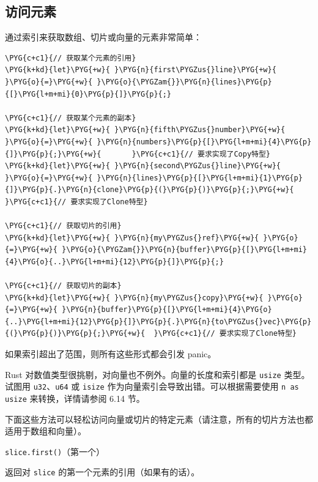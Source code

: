 \subsection{访问元素}

通过索引来获取数组、切片或向量的元素非常简单：

\begin{Verbatim}[commandchars=\\\{\},breaklines=true,breakanywhere=true,fontsize=\codefont,xleftmargin=17bp]
\PYG{c+c1}{// 获取某个元素的引用}
\PYG{k+kd}{let}\PYG{+w}{ }\PYG{n}{first\PYGZus{}line}\PYG{+w}{ }\PYG{o}{=}\PYG{+w}{ }\PYG{o}{\PYGZam{}}\PYG{n}{lines}\PYG{p}{[}\PYG{l+m+mi}{0}\PYG{p}{]}\PYG{p}{;}

\PYG{c+c1}{// 获取某个元素的副本}
\PYG{k+kd}{let}\PYG{+w}{ }\PYG{n}{fifth\PYGZus{}number}\PYG{+w}{ }\PYG{o}{=}\PYG{+w}{ }\PYG{n}{numbers}\PYG{p}{[}\PYG{l+m+mi}{4}\PYG{p}{]}\PYG{p}{;}\PYG{+w}{       }\PYG{c+c1}{// 要求实现了Copy特型}
\PYG{k+kd}{let}\PYG{+w}{ }\PYG{n}{second\PYGZus{}line}\PYG{+w}{ }\PYG{o}{=}\PYG{+w}{ }\PYG{n}{lines}\PYG{p}{[}\PYG{l+m+mi}{1}\PYG{p}{]}\PYG{p}{.}\PYG{n}{clone}\PYG{p}{(}\PYG{p}{)}\PYG{p}{;}\PYG{+w}{  }\PYG{c+c1}{// 要求实现了Clone特型}

\PYG{c+c1}{// 获取切片的引用}
\PYG{k+kd}{let}\PYG{+w}{ }\PYG{n}{my\PYGZus{}ref}\PYG{+w}{ }\PYG{o}{=}\PYG{+w}{ }\PYG{o}{\PYGZam{}}\PYG{n}{buffer}\PYG{p}{[}\PYG{l+m+mi}{4}\PYG{o}{..}\PYG{l+m+mi}{12}\PYG{p}{]}\PYG{p}{;}

\PYG{c+c1}{// 获取切片的副本}
\PYG{k+kd}{let}\PYG{+w}{ }\PYG{n}{my\PYGZus{}copy}\PYG{+w}{ }\PYG{o}{=}\PYG{+w}{ }\PYG{n}{buffer}\PYG{p}{[}\PYG{l+m+mi}{4}\PYG{o}{..}\PYG{l+m+mi}{12}\PYG{p}{]}\PYG{p}{.}\PYG{n}{to\PYGZus{}vec}\PYG{p}{(}\PYG{p}{)}\PYG{p}{;}\PYG{+w}{  }\PYG{c+c1}{// 要求实现了Clone特型}
\end{Verbatim}

如果索引超出了范围，则所有这些形式都会引发 panic。

Rust 对数值类型很挑剔，对向量也不例外。向量的长度和索引都是 \texttt{usize} 类型。试图用 \texttt{u32}、\texttt{u64} 或 \texttt{isize} 作为向量索引会导致出错。可以根据需要使用 \texttt{n as usize} 来转换，详情请参阅 6.14 节。

下面这些方法可以轻松访问向量或切片的特定元素（请注意，所有的切片方法也都适用于数组和向量）。

\begin{mySidenote}
\texttt{slice.first()}（第一个）
\end{mySidenote}

返回对 \texttt{slice} 的第一个元素的引用（如果有的话）。

